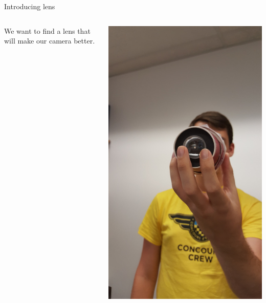 \begin{frame}{Introducing lens}
  \begin{columns}
    \begin{column}{0.6\textwidth}
      We want to find a lens that will make our camera better.
    \end{column}
    \begin{column}{0.4\textwidth}
      \includegraphics[width=\textwidth]{media/with-lens-camera.jpg}
    \end{column}
  \end{columns}
\end{frame}

